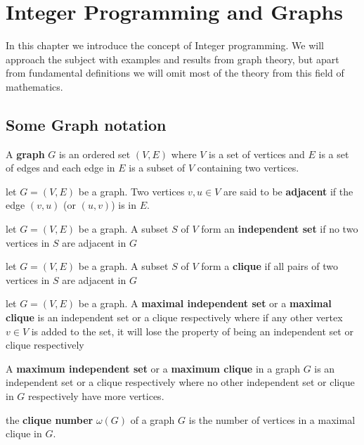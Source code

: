 \chapter{Integer Programming and Graphs}
In this chapter we introduce the concept of Integer programming. We will approach the subject with examples and results from graph theory, but apart from fundamental definitions we will omit most of the theory from this field of mathematics. 
\section{Some Graph notation}
\begin{definition}\label{cromatic number}
A \textbf{graph} $G$ is an ordered set $(V,E)$ where $V$ is a set of vertices and $E$ is a set of edges and each edge in $E$ is a subset of $V$ containing two vertices.
\end{definition}
\begin{definition}
let $G=(V,E)$ be a graph. Two vertices $v,u\in V$ are said to be \textbf{adjacent} if the edge $(v,u)$ (or $(u,v)$) is in $E$.
\end{definition}
\begin{definition}
let $G=(V,E)$ be a graph. A subset $S$ of $V$ form an \textbf{independent set} if no two vertices in $S$ are adjacent in $G$
\end{definition}
\begin{definition}
let $G=(V,E)$ be a graph. A subset $S$ of $V$ form a \textbf{clique} if all pairs of two vertices in $S$ are adjacent in $G$
\end{definition}
\begin{definition}
let $G=(V,E)$ be a graph. A \textbf{maximal independent set} or a \textbf{maximal clique} is an independent set or a clique respectively where if any other vertex $v \in V$ is added to the set, it will lose the property of being an independent set or clique respectively 
\end{definition}
\begin{definition}
A \textbf{maximum independent set} or a \textbf{maximum clique} in a graph $G$ is an independent set or a clique respectively where no other independent set or clique in $G$ respectively have more vertices.
\end{definition}
\begin{definition}
the \textbf{clique number} $\omega(G)$ of a graph $G$ is the number of vertices in a maximal clique in $G$.
\end{definition}

